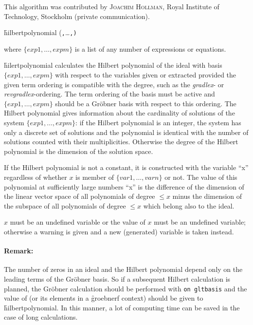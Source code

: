 This algorithm was contributed by \textsc{Joachim Hollman}, Royal
Institute of Technology, Stockholm (private communication).
\hypertarget{operator:HILBERTPOLYNOMIAL}{}
\begin{syntax}
  \f{hilbertpolynomial (}\texttt{,}\ldots\texttt{,}\texttt{)}
\end{syntax}
where $\{exp1, \ldots , expm\}$ is a list of any number of expressions
or equations.

\f{hilertpolynomial} calculates the Hilbert polynomial of the ideal
with basis $\{exp1, \ldots , expm\}$ with respect to the
variables given or extracted provided the given term ordering is
compatible with the degree, such as the \emph{gradlex}- or \emph{revgradlex}-ordering.
The term ordering of the basis
must be active and $\{exp1, \ldots, expm\}$ should be a
Gr\"obner basis with respect to this ordering. The Hilbert polynomial
gives information about the cardinality of solutions of the system
$\{exp1, \ldots , expm\}$: if the Hilbert polynomial is an
integer, the system has only a discrete set of solutions and the
polynomial is identical with the number of solutions counted with
their multiplicities. Otherwise the degree of the Hilbert
polynomial is the dimension of the solution space.

If the Hilbert polynomial is not a constant, it is constructed with the
variable ``x'' regardless of whether $x$ is member of
$\{var1, \ldots , varn\}$ or not. The value of this polynomial at
sufficiently large numbers  ``x'' is the difference
of the dimension of the linear vector space of all polynomials of degree
$ \leq x $ minus the dimension of the subspace of all polynomials of
degree $\leq x $ which belong also to the ideal.

$x$ must be an undefined variable or the value of $x$ must be an undefined
variable; otherwise a warning is given and a new (generated) variable
is taken instead.

\paragraph{Remark:} The number of zeros in an ideal and the
Hilbert polynomial depend only on the leading terms of the
Gr\"obner basis. So if a subsequent Hilbert calculation is planned, the
Gr\"obner calculation should be performed with \texttt{on gltbasis} and
the value of  (or its elements in a \f{groebnerf} context) should be
given to \f{hilbertpolynomial}. In this manner, a lot of computing time can be
saved in the case of long calculations.

